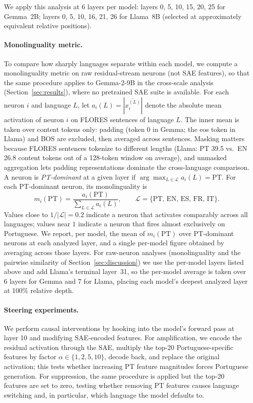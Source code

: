 \documentclass[runningheads]{llncs}
\begin{document}
We apply this analysis at 6 layers per model: layers 0, 5, 10, 15, 20, 25 for Gemma~2B; layers 0, 5, 10, 16, 21, 26 for Llama~8B (selected at approximately equivalent relative positions).

\paragraph{Monolinguality metric.}
\label{sec:monolinguality}

To compare how sharply languages separate within each model, we compute a monolinguality metric on raw residual-stream neurons (not SAE features), so that the same procedure applies to Gemma-2-9B in the cross-scale analysis (Section~\ref{sec:results}), where no pretrained SAE suite is available. For each neuron $i$ and language $L$, let $a_i(L) = |\overline{x_i^{(L)}}|$ denote the absolute mean activation of neuron $i$ on FLORES sentences of language $L$. The inner mean is taken over content tokens only: padding (token 0 in Gemma; the eos token in Llama) and BOS are excluded, then averaged across sentences. Masking matters because FLORES sentences tokenize to different lengths (Llama: PT 39.5 vs.\ EN 26.8 content tokens out of a 128-token window on average), and unmasked aggregation lets padding representations dominate the cross-language comparison. A neuron is \emph{PT-dominant} at a given layer if $\arg\max_{L \in \mathcal{L}} a_i(L) = \text{PT}$. For each PT-dominant neuron, its monolinguality is
\begin{equation}
m_i(\text{PT}) = \frac{a_i(\text{PT})}{\sum_{L \in \mathcal{L}} a_i(L)},
\qquad \mathcal{L} = \{\text{PT, EN, ES, FR, IT}\}.
\label{eq:monolinguality}
\end{equation}
Values close to $1/|\mathcal{L}| = 0.2$ indicate a neuron that activates comparably across all languages; values near $1$ indicate a neuron that fires almost exclusively on Portuguese. We report, per model, the mean of $m_i(\text{PT})$ over PT-dominant neurons at each analyzed layer, and a single per-model figure obtained by averaging across those layers. For raw-neuron analyses (monolinguality and the pairwise similarity of Section~\ref{sec:discussion}) we use the per-model layers listed above and add Llama's terminal layer~31, so the per-model average is taken over 6 layers for Gemma and 7 for Llama, placing each model's deepest analyzed layer at 100\% relative depth.

\paragraph{Steering experiments.}
We perform causal interventions by hooking into the model's forward pass at layer 10 and modifying SAE-encoded features. For amplification, we encode the residual activation through the SAE, multiply the top-20 Portuguese-specific features by factor $\alpha \in \{1, 2, 5, 10\}$, decode back, and replace the original activation; this tests whether increasing PT feature magnitudes forces Portuguese generation. For suppression, the same procedure is applied but the top-20 features are set to zero, testing whether removing PT features causes language switching and, in particular, which language the model defaults to.
\end{document}

